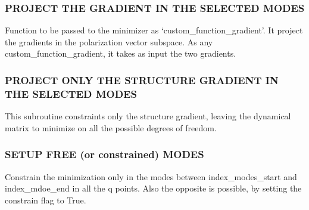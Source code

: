 \documentclass[a4paper,11pt,english]{sphinxmanual}
\begin{document}
\begin{fulllineitems}
\begin{fulllineitems}
\subsubsection{PROJECT THE GRADIENT IN THE SELECTED MODES}
\label{\detokenize{apireference:project-the-gradient-in-the-selected-modes}}
\sphinxAtStartPar
Function to be passed to the minimizer as ‘custom\_function\_gradient’. 
It project the gradients in the polarization vector subspace.
As any custom\_function\_gradient, it takes as input the two gradients.

\end{fulllineitems}


\begin{fulllineitems}
\label{\detokenize{apireference:sscha.Utilities.ModeProjection.CFG_ProjectStructure}}
\pysigstartsignatures
{}
\pysigstopsignatures

\subsubsection{PROJECT ONLY THE STRUCTURE GRADIENT IN THE SELECTED MODES}
\label{\detokenize{apireference:project-only-the-structure-gradient-in-the-selected-modes}}
\sphinxAtStartPar
This subroutine constraints only the structure gradient, leaving the
dynamical matrix to minimize on all the possible degrees of freedom.

\end{fulllineitems}


\begin{fulllineitems}
\label{\detokenize{apireference:sscha.Utilities.ModeProjection.SetupFreeModes}}
\pysigstartsignatures
{}
\pysigstopsignatures

\subsubsection{SETUP FREE (or constrained) MODES}
\label{\detokenize{apireference:setup-free-or-constrained-modes}}
\sphinxAtStartPar
Constrain the minimization only in the modes between index\_modes\_start and
index\_mdoe\_end in all the q points. Also the opposite is possible, 
by setting the constrain flag to True.


\end{fulllineitems}
\end{fulllineitems}
\end{document}
